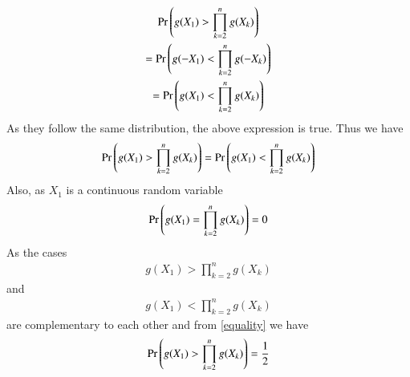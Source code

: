 \documentclass[journal,12pt,twocolumn]{IEEEtran}
\begin{document}
\begin{multline}
    \Pr\left(g(X_1)>\prod_{k=2}^ng(X_k)\right)\\=
    \Pr\left(g(-X_1)<\prod_{k=2}^ng(-X_k)\right)\\=
    \Pr\left(g(X_1)<\prod_{k=2}^ng(X_k)\right)
\end{multline}
As they follow the same distribution, the above expression is true. Thus we have
\begin{align}\label{equality}
    \Pr\left(g(X_1)>\prod_{k=2}^ng(X_k)\right)=
    \Pr\left(g(X_1)<\prod_{k=2}^ng(X_k)\right)
\end{align}
Also, as $X_1$ is a continuous random variable
\begin{align}
    \Pr\left(g(X_1)=\prod_{k=2}^ng(X_k)\right)=0
\end{align}
As the cases
\begin{align}
    g(X_1)>\prod_{k=2}^ng(X_k)
\end{align}
and
\begin{align}
    {g(X_1)<\prod_{k=2}^ng(X_k)}
\end{align}
are complementary to each other and from 
 \eqref{equality} we have
\begin{align}\label{prod}
 \Pr\left(g(X_1)>\prod_{k=2}^ng(X_k)\right)=\frac{1}{2}    
\end{align}
\end{document}
